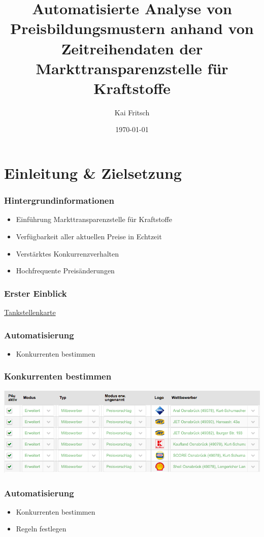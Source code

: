 \documentclass[hyperref={pdfpagelabels=false}]{beamer}
\title{Automatisierte Analyse von Preisbildungsmustern anhand von Zeitreihendaten der Markttransparenzstelle für Kraftstoffe}
\author{Kai Fritsch}
\date{\today}
\begin{document}
\begin{frame}
\titlepage
\end{frame} 

\section{Einleitung \& Zielsetzung} 
\begin{frame}
\frametitle{Hintergrundinformationen} 
\begin{itemize}
\item Einführung Markttransparenzstelle für Kraftstoffe
\item Verfügbarkeit aller aktuellen Preise in Echtzeit
\item Verstärktes Konkurrenzverhalten
\item Hochfrequente Preisänderungen
\end{itemize} 
\end{frame}

\begin{frame}
\frametitle{Erster Einblick} 
\href{http://10.1.0.1:8091/client/}{Tankstellenkarte}
\end{frame}

\begin{frame}
\frametitle{Automatisierung} 
\begin{itemize}
\item Konkurrenten bestimmen
\end{itemize}
\end{frame}

\begin{frame}
\frametitle{Konkurrenten bestimmen}
\begin{center}
\includegraphics[scale=0.35]{konkurenz.png}
\end{center}
\end{frame}

\begin{frame}
\frametitle{Automatisierung}
\begin{itemize}
\item Konkurrenten bestimmen
\item Regeln festlegen
\end{itemize}
\end{frame}
\end{document}
